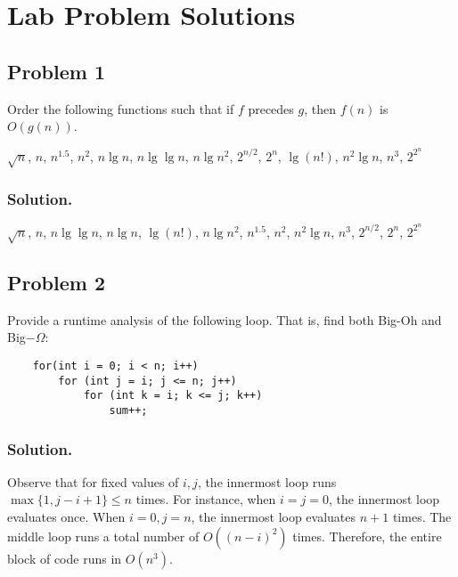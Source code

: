 


\section*{Lab Problem Solutions}

\subsection*{Problem 1}
Order the following functions such that if $f$ precedes $g$, then $f(n)$ is $O(g(n))$.

\begin{center}
    $\sqrt{n}$, $n$, $n^{1.5}$, $n^2$, $n \lg{n}$, $n\lg\lg{n}$, $n\lg{n^2}$, $2^{n/2}$, $2^n$, $\lg(n!)$, $n^2\lg{n}$, $n^3$, $2^{2^n}$
\end{center}

\subsubsection*{Solution.}
\begin{center}
    $\sqrt{n}$, $n$, $n\lg \lg n$, $n \lg n$, $\lg(n!)$, $n\lg{n^2}$, $n^{1.5}$, $n^2$, $n^2\lg{n}$, $n^3$, $2^{n/2}$, $2^n$, $2^{2^n}$
\end{center}

\subsection*{Problem 2}
Provide a runtime analysis of the following loop. That is, find both Big-Oh and Big$-\Omega$:

\begin{verbatim}
    for(int i = 0; i < n; i++)
        for (int j = i; j <= n; j++)
            for (int k = i; k <= j; k++)
                sum++;
\end{verbatim}

\subsubsection*{Solution.}

Observe that for fixed values of $i, j$, the innermost loop runs $\max\{1, j-i+1\} \leq n$ times. For instance, when $i = j = 0$, the innermost loop evaluates once. When $i = 0, j = n$, the innermost loop evaluates $n+1$ times. The middle loop runs a total number of $O((n-i)^2)$ times. Therefore, the entire block of code runs in $O(n^3)$.\\

